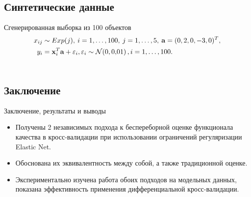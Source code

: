 \documentclass[unicode,lefteqn,c,hyperref={pdfpagelabels=false}]{beamer}
\begin{document}
\subsection{Синтетические данные}
\begin{frame}{Сгенерированная выборка из 100 объектов}
	\vspace{-20pt}
	\begin{align*}
		x_{ij} &\sim Exp(j), \: i=1,\ldots,100, \: j=1,\ldots,5, \: \boldsymbol{\mathbf{a}} = (0, 2, 0, -3, 0)^T, \\
		y_{i} &= \boldsymbol{\mathbf{x}}_i^T \boldsymbol{\mathbf{a}} + {\varepsilon}_i, {\varepsilon}_i \sim \mathcal{N}\!\left(0,0{,}01\right), i=1,\ldots,100. 
	\end{align*}
	\vspace{-15pt}
	\begin{columns}
		\hspace{-15pt}
	\end{columns}
\end{frame}

\section*{}
\subsection{Заключение}
\begin{frame}{Заключение, результаты и выводы}
\begin{itemize}
	\item Получены 2 независимых подхода к беспереборной оценке функционала качества в кросс-валидации при использовании ограничений регуляризации Elastic Net.
	\item Обоснована их эквивалентность между собой, а также традиционной оценке.
	\item Экспериментально изучена работа обоих подходов на модельных 
	данных, показана эффективность применения дифференциальной кросс-валидации.
\end{itemize}
\end{frame}
\end{document}
